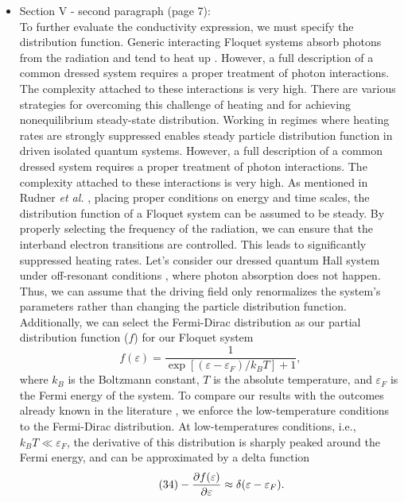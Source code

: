 \documentclass{article}
\begin{document}
\begin{itemize}
  \item Section V - second paragraph (page 7):\\
  {\color{Red}
  To further evaluate the conductivity expression, we must specify the distribution function. Generic interacting Floquet systems absorb photons from the radiation and tend to heat up \cite{seetharam2019,rudner2020}.
  However, a full description of a common dressed system requires a proper treatment of photon interactions. The complexity attached to these interactions is very high. There are various strategies \cite{lindner2017,bukov2015,eckardt2015,kuwahara2016,abanin2017,mori2018,rudner2020} for overcoming this challenge of heating and for achieving nonequilibrium steady-state distribution. Working in regimes where heating rates are strongly suppressed enables steady particle distribution function in driven isolated quantum systems. However, a full description of a common dressed system requires a proper treatment of photon interactions. The complexity attached to these interactions is very high.
  As mentioned in Rudner \textit{et al.} \cite{rudner2020}, placing proper conditions on energy and time scales, the distribution function of a Floquet system can be assumed to be steady. By properly selecting the frequency of the radiation, we can ensure that the interband electron transitions are controlled. This leads to significantly suppressed heating rates.
  Let's consider our dressed quantum Hall system under off-resonant conditions \cite{rudner2020,wackerlthesis20}, where photon absorption does not happen. Thus, we can assume that the driving field only renormalizes the system's parameters rather than changing the particle distribution function.
  Additionally, we can select the Fermi-Dirac distribution as our partial distribution function ($f$) for our Floquet system
  \begin{equation} \tag{33}
    f(\varepsilon) = \frac{1}{\exp[(\varepsilon - \varepsilon_F)/k_B T]+1},
  \end{equation}
  where $k_B$ is the Boltzmann constant, $T$ is the absolute temperature, and $\varepsilon_F$ is the Fermi energy of the system. To compare our results with the outcomes already known in the literature \cite{dini16,endo09}, we enforce the low-temperature conditions to the Fermi-Dirac distribution.
  At low-temperatures conditions, i.e., $k_BT \ll \varepsilon_F$, the derivative of this distribution is sharply peaked around the Fermi energy, and can be approximated by a delta function \cite{endo09}
  \begin{equation} \tag{34}
    - \pdv{f(\varepsilon)}{\varepsilon} \approx \delta(\varepsilon - \varepsilon_F).
  \end{equation}
  }
\end{itemize}
\end{document}
